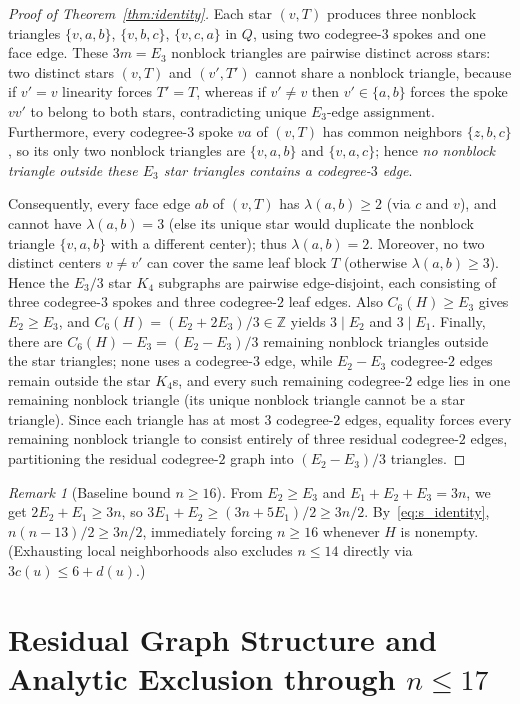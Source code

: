 \documentclass[11pt]{amsart}
\theoremstyle{definition}
\theoremstyle{remark}
\newtheorem{remark}[theorem]{Remark}
\newcommand{\Z}{\mathbb{Z}}
\begin{document}
\begin{proof}[Proof of Theorem~\ref{thm:identity}]
Each star $(v, T)$ produces three nonblock triangles $\{v,a,b\}$, $\{v,b,c\}$, $\{v,c,a\}$ in $Q$, using two codegree-$3$ spokes and one face edge. These $3m = E_3$ nonblock triangles are pairwise distinct across stars: two distinct stars $(v,T)$ and $(v',T')$ cannot share a nonblock triangle, because if $v'=v$ linearity forces $T'=T$, whereas if $v' \ne v$ then $v' \in \{a,b\}$ forces the spoke $vv'$ to belong to both stars, contradicting unique $E_3$-edge assignment. Furthermore, every codegree-$3$ spoke $va$ of $(v,T)$ has common neighbors $\{z, b, c\}$, so its only two nonblock triangles are $\{v,a,b\}$ and $\{v,a,c\}$; hence \emph{no nonblock triangle outside these $E_3$ star triangles contains a codegree-$3$ edge}.

Consequently, every face edge $ab$ of $(v, T)$ has $\lambda(a,b) \ge 2$ (via $c$ and $v$), and cannot have $\lambda(a,b) = 3$ (else its unique star would duplicate the nonblock triangle $\{v,a,b\}$ with a different center); thus $\lambda(a,b) = 2$. Moreover, no two distinct centers $v \ne v'$ can cover the same leaf block $T$ (otherwise $\lambda(a,b) \ge 3$). Hence the $E_3/3$ star $K_4$ subgraphs are pairwise edge-disjoint, each consisting of three codegree-$3$ spokes and three codegree-$2$ leaf edges. Also $C_6(H) \ge E_3$ gives $E_2 \ge E_3$, and $C_6(H) = (E_2 + 2E_3)/3 \in \Z$ yields $3 \mid E_2$ and $3 \mid E_1$. Finally, there are $C_6(H) - E_3 = (E_2 - E_3)/3$ remaining nonblock triangles outside the star triangles; none uses a codegree-$3$ edge, while $E_2 - E_3$ codegree-$2$ edges remain outside the star $K_4$s, and every such remaining codegree-$2$ edge lies in one remaining nonblock triangle (its unique nonblock triangle cannot be a star triangle). Since each triangle has at most $3$ codegree-$2$ edges, equality forces every remaining nonblock triangle to consist entirely of three residual codegree-$2$ edges, partitioning the residual codegree-$2$ graph into $(E_2 - E_3)/3$ triangles.
\end{proof}

\begin{remark}[Baseline bound $n \ge 16$]\label{rem:n16}
From $E_2 \ge E_3$ and $E_1 + E_2 + E_3 = 3n$, we get $2E_2 + E_1 \ge 3n$, so $3E_1 + E_2 \ge (3n + 5E_1)/2 \ge 3n/2$. By~\eqref{eq:s_identity}, $n(n-13)/2 \ge 3n/2$, immediately forcing $n \ge 16$ whenever $H$ is nonempty. (Exhausting local neighborhoods also excludes $n \le 14$ directly via $3c(u) \le 6 + d(u)$.)
\end{remark}

\section{Residual Graph Structure and Analytic Exclusion through $n \le 17$}
\end{document}
